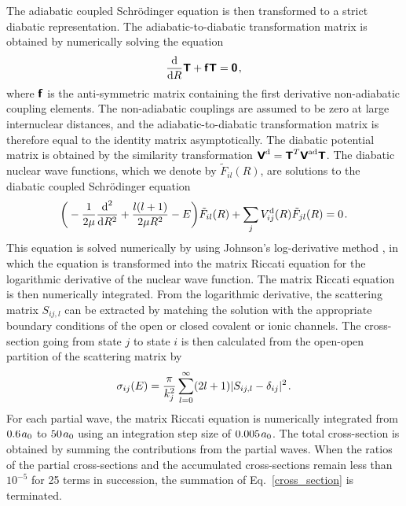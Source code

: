 \documentclass[fleqn,usenatbib]{mnras}
\begin{document}
The adiabatic coupled Schrödinger equation is then transformed to a strict diabatic representation. The adiabatic-to-diabatic transformation matrix is obtained by numerically solving the equation \citep[][]{mead1982}
\begin{align}
\dfrac{\textrm{d}}{\textrm{d} R}\textbf{\textsf{T}}+\textbf{\textsf{f}}\textbf{\textsf{T}}=\textbf{\textsf{0}} \hspace{1 pt},
\end{align}
where $\textbf{\textsf{f}}$ is the anti-symmetric matrix containing the first derivative non-adiabatic coupling elements. The non-adiabatic couplings are assumed to be zero at large internuclear distances, and the adiabatic-to-diabatic transformation matrix is therefore equal to the identity matrix asymptotically. The diabatic potential matrix is obtained by the similarity transformation $\textbf{\textsf{V}}^{\rm d}=\textbf{\textsf{T}}^T\textbf{\textsf{V}}^{\rm ad}\textbf{\textsf{T}}$. The diabatic nuclear wave functions, which we denote by $\tilde{F}_{il}(R)$, are solutions to the diabatic coupled Schrödinger equation
\begin{align}
\bigg(-\dfrac{1}{2\mu}\dfrac{\textrm{d}^2}{\textrm{d}R^2} + \dfrac{l(l+1)}{2\mu R^2} -E\bigg)\tilde{F}_{il}(R) + \sum_jV_{ij}^{\rm d}(R)\tilde{F}_{jl}(R) = 0 \hspace{1 pt}.
\end{align}
This equation is solved numerically by using Johnson's log-derivative method \citep[][]{johnson1973}, in which the equation is transformed into the matrix Riccati equation for the logarithmic derivative of the nuclear wave function. The matrix Riccati equation is then numerically integrated. From the logarithmic derivative, the scattering matrix $S_{ij,l}$ can be extracted by matching the solution with the appropriate boundary conditions of the open or closed covalent or ionic channels. The cross-section going from state $j$ to state $i$ is then calculated from the open-open partition of the scattering matrix by 
\begin{align}
\sigma_{ij}(E) = \frac{\pi}{k_j^2}\sum_{l=0}^\infty(2l+1)|S_{ij,l}-\delta_{ij}|^2 \hspace{1 pt}.\label{cross_section}
\end{align}
For each partial wave, the matrix Riccati equation is numerically integrated from $0.6 \hspace{1 pt} a_0$ to $50 \hspace{1 pt} a_0$ using an integration step size of $0.005 \hspace{1 pt} a_0$. The total cross-section is obtained by summing the contributions from the partial waves. When the ratios of the partial cross-sections and the accumulated cross-sections remain less than $10^{-5}$ for 25 terms in succession, the summation of Eq.~\eqref{cross_section} is terminated.
\end{document}

